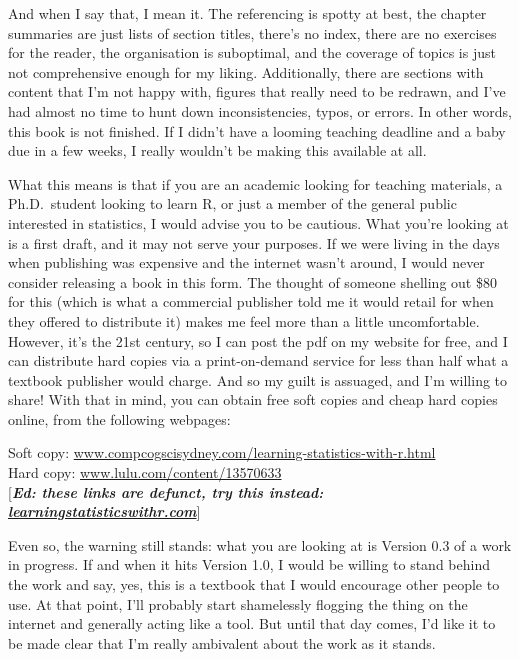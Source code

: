 \documentclass[
]{book}
\begin{document}
And when I say that, I mean it. The referencing is spotty at best, the
chapter summaries are just lists of section titles, there's no index,
there are no exercises for the reader, the organisation is suboptimal,
and the coverage of topics is just not comprehensive enough for my
liking. Additionally, there are sections with content that I'm not happy
with, figures that really need to be redrawn, and I've had almost no
time to hunt down inconsistencies, typos, or errors. In other words,
this book is not finished. If I didn't have a looming teaching deadline
and a baby due in a few weeks, I really wouldn't be making this
available at all.

What this means is that if you are an academic looking for teaching
materials, a Ph.D.~student looking to learn R, or just a member of the
general public interested in statistics, I would advise you to be
cautious. What you're looking at is a first draft, and it may not serve
your purposes. If we were living in the days when publishing was
expensive and the internet wasn't around, I would never consider
releasing a book in this form. The thought of someone shelling out \$80
for this (which is what a commercial publisher told me it would retail
for when they offered to distribute it) makes me feel more than a little
uncomfortable. However, it's the 21st century, so I can post the pdf on
my website for free, and I can distribute hard copies via a
print-on-demand service for less than half what a textbook publisher
would charge. And so my guilt is assuaged, and I'm willing to share!
With that in mind, you can obtain free soft copies and cheap hard copies
online, from the following webpages:

Soft copy:
\href{https://www.compcogscisydney.com/learning-statistics-with-r.html}{www.compcogscisydney.com/learning-statistics-with-r.html}\\
Hard copy:
\href{https://www.lulu.com/content/13570633}{www.lulu.com/content/13570633}\\
{[}\textbf{\emph{Ed: these links are defunct, try this instead:
\href{https://learningstatisticswithr.com}{learningstatisticswithr.com}}}{]}

Even so, the warning still stands: what you are looking at is Version
0.3 of a work in progress. If and when it hits Version 1.0, I would be
willing to stand behind the work and say, yes, this is a textbook that I
would encourage other people to use. At that point, I'll probably start
shamelessly flogging the thing on the internet and generally acting like
a tool. But until that day comes, I'd like it to be made clear that I'm
really ambivalent about the work as it stands.
\end{document}
